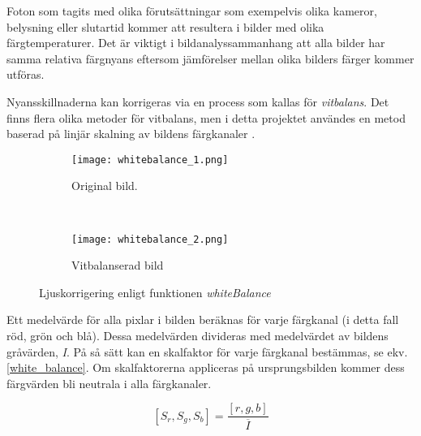 \documentclass[a4paper,12pt,oneside,final]{extbook}
\begin{document}
Foton som tagits med olika förutsättningar som exempelvis olika kameror, belysning eller slutartid kommer att resultera i bilder med olika färgtemperaturer. Det är viktigt i bildanalyssammanhang att alla bilder har samma relativa färgnyans eftersom jämförelser mellan olika bilders färger kommer utföras.

Nyansskillnaderna kan korrigeras via en process som kallas för \textit{vitbalans}. Det finns flera olika metoder för vitbalans, men i detta projektet användes en metod baserad på linjär skalning av bildens färgkanaler \cite{whitebalance}.

\begin{figure}[h]
    \centering
    \begin{subfigure}[b]{0.4\textwidth}
        \texttt{[image: whitebalance\_1.png]}
        \caption{Original bild.}
        \label{fig:whitebalance_1}
    \end{subfigure}
    ~ %
    \begin{subfigure}[b]{0.4\textwidth}
        \texttt{[image: whitebalance\_2.png]}
        \caption{Vitbalanserad bild}
        \label{fig:whitebalance_2}
    \end{subfigure}

    \caption{Ljuskorrigering enligt funktionen \textit{whiteBalance} }
    \label{fig:whitebalance}
\end{figure}


Ett medelvärde för alla pixlar i bilden beräknas för varje färgkanal (i detta fall röd, grön och blå). Dessa medelvärden divideras med medelvärdet av bildens gråvärden, \textit{I}. På så sätt kan en skalfaktor för varje färgkanal bestämmas, se ekv. \ref{white_balance}. Om skalfaktorerna appliceras på ursprungsbilden kommer dess färgvärden bli neutrala i alla färgkanaler.

\begin{equation} \label{white_balance}
[S_{r},S_{g},S_{b}] = \frac{ [r,g,b] }{ \overline{I} }
\end{equation}
\end{document}
